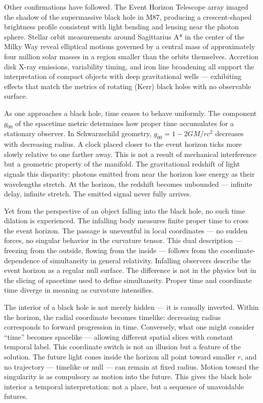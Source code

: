 Other confirmations have followed. The Event Horizon Telescope array imaged the shadow of the supermassive black hole in M87, producing a crescent-shaped brightness profile consistent with light bending and lensing near the photon sphere. Stellar orbit measurements around Sagittarius A* in the center of the Milky Way reveal elliptical motions governed by a central mass of approximately four million solar masses in a region smaller than the orbits themselves. Accretion disk X-ray emissions, variability timing, and iron line broadening all support the interpretation of compact objects with deep gravitational wells — exhibiting effects that match the metrics of rotating (Kerr) black holes with no observable surface.


As one approaches a black hole, time ceases to behave uniformly. The component $g_{00}$ of the spacetime metric determines how proper time accumulates for a stationary observer. In Schwarzschild geometry, $g_{00} = 1 - 2GM/rc^2$ decreases with decreasing radius. A clock placed closer to the event horizon ticks more slowly relative to one farther away. This is not a result of mechanical interference but a geometric property of the manifold. The gravitational redshift of light signals this disparity: photons emitted from near the horizon lose energy as their wavelengths stretch. At the horizon, the redshift becomes unbounded — infinite delay, infinite stretch. The emitted signal never fully arrives.


Yet from the perspective of an object falling into the black hole, no such time dilation is experienced. The infalling body measures finite proper time to cross the event horizon. The passage is uneventful in local coordinates — no sudden forces, no singular behavior in the curvature tensor. This dual description — freezing from the outside, flowing from the inside — follows from the coordinate-dependence of simultaneity in general relativity. Infalling observers describe the event horizon as a regular null surface. The difference is not in the physics but in the slicing of spacetime used to define simultaneity. Proper time and coordinate time diverge in meaning as curvature intensifies.


The interior of a black hole is not merely hidden — it is causally inverted. Within the horizon, the radial coordinate becomes timelike: decreasing radius corresponds to forward progression in time. Conversely, what one might consider “time” becomes spacelike — allowing different spatial slices with constant temporal label. This coordinate switch is not an illusion but a feature of the solution. The future light cones inside the horizon all point toward smaller $r$, and no trajectory — timelike or null — can remain at fixed radius. Motion toward the singularity is as compulsory as motion into the future. This gives the black hole interior a temporal interpretation: not a place, but a sequence of unavoidable futures.


